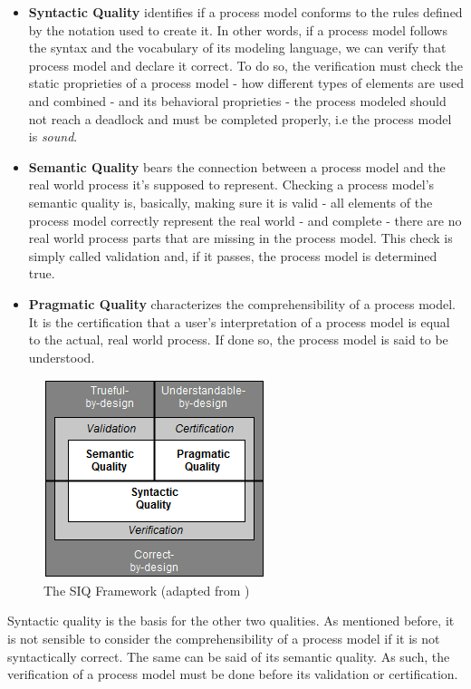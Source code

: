 \documentclass[a4paper,twoside]{article}
\begin{document}
\begin{itemize}
	\item \textbf{Syntactic Quality} identifies if a process model conforms to the rules defined by the notation used to create it. In other words, if a process model follows the syntax and the vocabulary of its modeling language, we can verify that process model and declare it correct. To do so, the verification must check the static proprieties of a process model - how different types of elements are used and combined - and its behavioral proprieties - the process modeled should not reach a deadlock and must be completed properly, i.e the process model is \textit{sound}.
	\item \textbf{Semantic Quality} bears the connection between a process model and the real world process it's supposed to represent. Checking a process model's semantic quality is, basically, making sure it is valid - all elements of the process model correctly represent the real world - and complete - there are no real world process parts that are missing in the process model. This check is simply called validation and, if it passes, the process model is determined true.
	\item \textbf{Pragmatic Quality} characterizes the comprehensibility of a process model. It is the certification that a user's interpretation of a process model is equal to the actual, real world process. If done so, the process model is said to be understood.
\end{itemize}


\begin{figure}
	\centering
	\includegraphics[scale=0.8]{SIQFramework.png}
	\caption{The SIQ Framework (adapted from \cite{Reijers2015})}
	\label{SIQFigure}
\end{figure}

Syntactic quality is the basis for the other two qualities. As mentioned before, it is not sensible to consider the comprehensibility of a process model if it is not syntactically correct. The same can be said of its semantic quality. As such, the verification of a process model must be done before its validation or certification.
\end{document}
